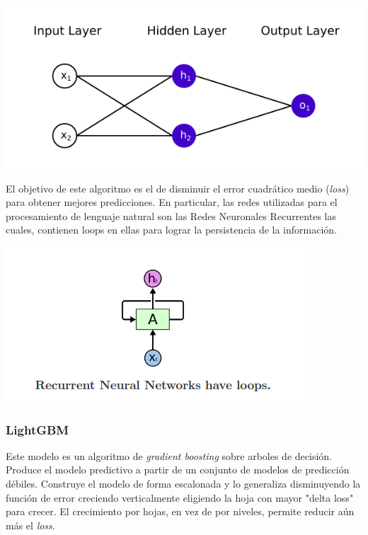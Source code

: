 \documentclass[12pt,a4paper]{article}
\begin{document}
\begin{center}
    \includegraphics[scale=0.5]{imgs/red neuronal.png}
\end{center}

El objetivo de este algoritmo es el de disminuir el error cuadrático medio (\textit{loss}) para obtener mejores predicciones.
En particular, las redes utilizadas para el procesamiento de lenguaje natural son las Redes Neuronales Recurrentes las cuales, contienen loops en ellas para lograr la persistencia de la información. 

\begin{center}
    \includegraphics[scale=0.5]{imgs/red neuronal recurrente.png}
\end{center}

\subsubsection{LightGBM}
Este modelo es un algoritmo de \textit{gradient boosting} sobre arboles de decisión.
Produce el modelo predictivo a partir de un conjunto de modelos de predicción débiles. Construye el modelo de forma escalonada y lo generaliza disminuyendo la función de error creciendo verticalmente eligiendo la hoja con mayor "delta loss" para crecer. El crecimiento por hojas, en vez de por niveles, permite reducir aún más el \textit{loss}.
\end{document}
